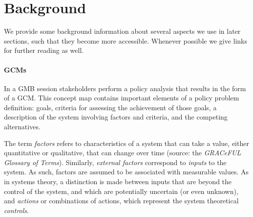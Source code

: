 \section{Background}
\label{sec:background}

We provide some background information about several aspects we use in
later sections, such that they become more accessible.
%
Whenever possible we give links for further reading as well.

\paragraph{\acfp{GCM}}
In a \acl{GMB} session stakeholders perform a policy analysis that
results in the form of a \acl{GCM}.
%
This concept map contains important elements of a policy problem
definition: goals, criteria for assessing the achievement of those
goals, a description of the system involving factors and criteria, and
the competing alternatives.

The term \emph{factors} refers to characteristics of a system that can
take a value, either quantitative or qualitative, that can change over
time (source: the \emph{GRACeFUL Glossary of Terms}).
%
Similarly, \emph{external factors} correspond to \emph{inputs} to the
system.
%
As such, factors are assumed to be associated with measurable
values.
%
As in systems theory, a distinction is made between inputs that are
beyond the control of the system, and which are potentially uncertain
(or even unknown), and \emph{actions} or combinations of actions,
which represent the system theoretical \emph{controls}.

